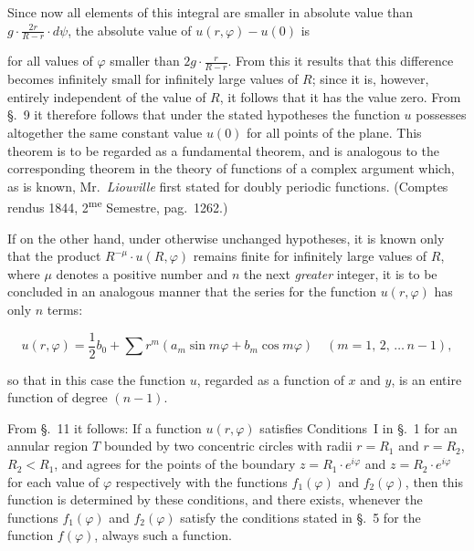 \documentclass{article}
\begin{document}
Since now all elements of this integral are smaller in absolute value than $g \cdot \frac{2r}{R - r} \cdot d\psi$, the absolute value of $u(r, \varphi) - u(0)$ is




for all values of $\varphi$ smaller than $2g \cdot \frac{r}{R - r}$. From this it results that this difference becomes infinitely small for infinitely large values of $R$; since it is, however, entirely independent of the value of $R$, it follows that it has the value zero. From §.~9 it therefore follows that under the stated hypotheses the function $u$ possesses altogether the same constant value $u(0)$ for all points of the plane. This theorem is to be regarded as a fundamental theorem, and is analogous to the corresponding theorem in the theory of functions of a complex argument which, as is known, Mr.~\emph{Liouville} first stated for doubly periodic functions. (Comptes rendus 1844, 2\textsuperscript{me} Semestre, pag.~1262.)



If on the other hand, under otherwise unchanged hypotheses, it is known only that the product $R^{-\mu} \cdot u(R, \varphi)$ remains finite for infinitely large values of $R$, where $\mu$ denotes a positive number and $n$ the next \emph{greater} integer, it is to be concluded in an analogous manner that the series for the function $u(r, \varphi)$ has only $n$ terms:

\[

u(r, \varphi) = \frac{1}{2} b_0 + \sum r^m (a_m \sin m\varphi + b_m \cos m\varphi) \quad (m = 1, \, 2, \, \dots \, n - 1),

\]

so that in this case the function $u$, regarded as a function of $x$ and $y$, is an entire function of degree $(n - 1)$.



From §.~11 it follows: If a function $u(r, \varphi)$ satisfies Conditions~I in §.~1 for an annular region $T$ bounded by two concentric circles with radii $r = R_1$ and $r = R_2$, $R_2 < R_1$, and agrees for the points of the boundary $z = R_1 \cdot e^{i\varphi}$ and $z = R_2 \cdot e^{i\varphi}$ for each value of $\varphi$ respectively with the functions $f_1(\varphi)$ and $f_2(\varphi)$, then this function is determined by these conditions, and there exists, whenever the functions $f_1(\varphi)$ and $f_2(\varphi)$ satisfy the conditions stated in §.~5 for the function $f(\varphi)$, always such a function.
\end{document}
